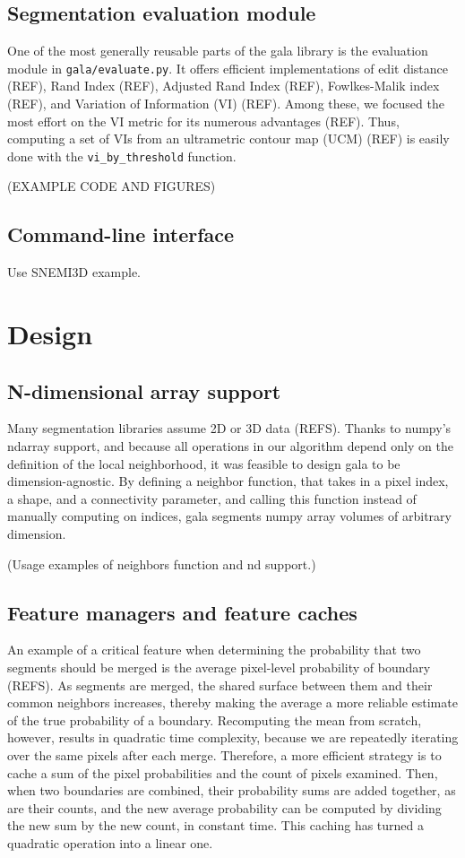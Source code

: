 \documentclass{frontiersSCNS} %
\begin{document}
\subsection{Segmentation evaluation module}

One of the most generally reusable parts of the gala library is the evaluation module in \texttt{gala/evaluate.py}.
It offers efficient implementations of edit distance (REF), Rand Index (REF), Adjusted Rand Index (REF), Fowlkes-Malik index (REF), and Variation of Information (VI) (REF).
Among these, we focused the most effort on the VI metric for its numerous advantages (REF).
Thus, computing a set of VIs from an ultrametric contour map (UCM) (REF) is easily done with the \texttt{vi\_by\_threshold} function.

(EXAMPLE CODE AND FIGURES)

\subsection{Command-line interface}

Use SNEMI3D example.


\section{Design}


\subsection{N-dimensional array support}
Many segmentation libraries assume 2D or 3D data (REFS).
Thanks to numpy's ndarray support, and because all operations in our algorithm depend only on the definition of the local neighborhood, it was feasible to design gala to be dimension-agnostic.
By defining a neighbor function, that takes in a pixel index, a shape, and a connectivity parameter, and calling this function instead of manually computing on indices, gala segments numpy array volumes of arbitrary dimension.

(Usage examples of neighbors function and nd support.)


\subsection{Feature managers and feature caches}

An example of a critical feature when determining the probability that two segments should be merged is the average pixel-level probability of boundary (REFS).
As segments are merged, the shared surface between them and their common neighbors increases, thereby making the average a more reliable estimate of the true probability of a boundary.
Recomputing the mean from scratch, however, results in quadratic time complexity, because we are repeatedly iterating over the same pixels after each merge.
Therefore, a more efficient strategy is to cache a sum of the pixel probabilities and the count of pixels examined.
Then, when two boundaries are combined, their probability sums are added together, as are their counts, and the new average probability can be computed by dividing the new sum by the new count, in constant time.
This caching has turned a quadratic operation into a linear one.
\end{document}
